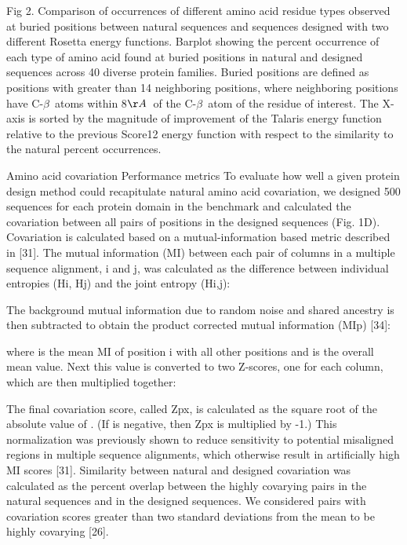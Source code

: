 Fig 2. Comparison of occurrences of different amino acid residue types observed at buried positions between natural sequences and sequences designed with two different Rosetta energy functions.
Barplot showing the percent occurrence of each type of amino acid found at buried positions in natural and designed sequences across 40 diverse protein families. Buried positions are defined as positions with greater than 14 neighboring positions, where neighboring positions have C-$\beta$\ atoms within 8$\AA$\ of the C-$\beta$\ atom of the residue of interest. The X-axis is sorted by the magnitude of improvement of the Talaris energy function relative to the previous Score12 energy function with respect to the similarity to the natural percent occurrences.

Amino acid covariation
Performance metrics
To evaluate how well a given protein design method could recapitulate natural amino acid covariation, we designed 500 sequences for each protein domain in the benchmark and calculated the covariation between all pairs of positions in the designed sequences (Fig. 1D). Covariation is calculated based on a mutual-information based metric described in [31]. The mutual information (MI) between each pair of columns in a multiple sequence alignment, i and j, was calculated as the difference between individual entropies (Hi, Hj) and the joint entropy (Hi,j):



The background mutual information due to random noise and shared ancestry is then subtracted to obtain the product corrected mutual information (MIp) [34]:



where  is the mean MI of position i with all other positions and  is the overall mean value. Next this value is converted to two Z-scores, one for each column, which are then multiplied together:


The final covariation score, called Zpx, is calculated as the square root of the absolute value of . (If  is negative, then Zpx is multiplied by -1.) This normalization was previously shown to reduce sensitivity to potential misaligned regions in multiple sequence alignments, which otherwise result in artificially high MI scores [31]. Similarity between natural and designed covariation was calculated as the percent overlap between the highly covarying pairs in the natural sequences and in the designed sequences. We considered pairs with covariation scores greater than two standard deviations from the mean to be highly covarying [26].

